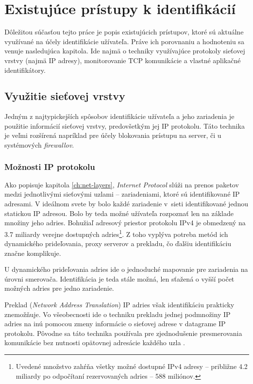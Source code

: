 \documentclass[
  printed, %
  table,   %
  lof,     %
  nolot,   %
  nocover
]{fithesis3}
\begin{document}
\chapter{Existujúce prístupy k identifikácií}
\label{ch:existing}
Dôležitou súčasťou tejto práce je popis existujúcich prístupov, ktoré
sú aktuálne využívané na účely identifikácie užívateľa. Práve ich porovnaniu
a hodnoteniu sa venuje nasledujúca kapitola.
Ide najmä o techniky využívajúce protokoly sieťovej vrstvy (najmä IP adresy),
monitorovanie TCP komunikácie a vlastné aplikačné identifikátory.

\section{Využitie sieťovej vrstvy}
Jedným z najtypickejších spôsobov identifikácie užívateľa a jeho zariadenia je
použitie informácií sieťovej vrstvy, predovšetkým jej IP protokolu.
Táto technika je veľmi rozšírená napríklad pre účely blokovania prístupu na
server, či u systémových \textit{firewallov}.

\subsection{Možnosti IP protokolu }
Ako popisuje kapitola \ref{ch:net-layers}, \textit{Internet Protocol} slúži na
prenos paketov medzi jednotlivými sieťovými uzlami -- zariadeniami, ktoré sú
identifikované IP adresami. V ideálnom svete by bolo každé zariadenie v~sieti
identifikované jednou statickou IP adresou. Bolo by teda možné užívateľa
rozpoznať len na základe množiny jeho adries. Bohužiaľ adresový priestor
protokolu IPv4 je obmedzený na 3.7 miliardy verejne dostupných adries\footnote{
  Uvedené množstvo zahŕňa všetky možné dostupné IPv4 adresy -- približne 4.2
  miliardy po odpočítaní rezervovaných adries -- 588 miliónov.
}.
Z toho vyplýva potreba metód ich dynamického prideľovania, proxy serverov a
prekladu, čo ďalšiu identifikáciu značne komplikuje.

U dynamického prideľovania adries ide o jednoduché mapovanie pre zariadenia
na úrovni smerovača. Identifikácia je teda stále možná, len sťažená o vyšší
počet možných adries pre jedno zariadenie.

Preklad (\textit{Network Address Translation}) IP adries však identifikáciu
prakticky znemožňuje. Vo všeobecnosti ide o techniku prekladu jednej podmnožiny
IP adries na inú pomocou zmeny informácie o sieťovej adrese v datagrame IP
protokolu. Pôvodne sa táto technika používala pre zjednodušenie presmerovania
komunikácie bez nutnosti opätovnej adresácie každého uzla \cite{Huston:NAT}. 
\end{document}
